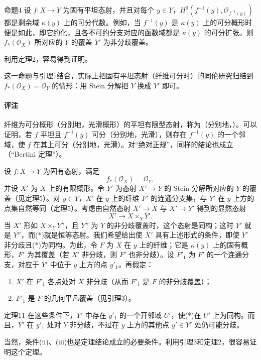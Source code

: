 \begin{statement}{命题4}
设 $f:X\to Y$ 为固有平坦态射，并且对每个 $y\in Y$，$H^0(f^{-1}(y),\mathcal O_{f^{-1}(y)})$ 都是剩余域 $\kappa(y)$ 上的可分代数。例如，当 $f^{-1}(y)$ 是 $\kappa(y)$ 上的可分概形时便是如此，即它约化，且各不可约分支对应的函数域都是 $\kappa(y)$ 的可分扩张。则 $f_*(\mathcal O_X)$ 所对应的 $Y$ 的覆盖 $Y'$ 为非分歧覆盖。
\end{statement}

利用定理2，容易得到证明。

这一命题与引理1结合，实际上把固有平坦态射（纤维可分时）的同伦研究归结到 $f_*(\mathcal O_X)=\mathcal O_Y$ 的情形：用 Stein 分解把 $Y$ 换成 $Y'$ 即可。

\paragraph{评注}
纤维为可分概形（分别地，光滑概形）的平坦有限型态射，称为（分别地，）。可以证明，若 $f$ 平坦且 $f^{-1}(y)$ 可分（分别地，光滑），则存在 $f^{-1}(y)$ 的一个邻域，使 $f$ 在其上可分（分别地，光滑）。对“绝对正规”，同样的结论也成立（“Bertini 定理”）。

设 $f:X\to Y$ 为固有态射，满足
\[
f_*(\mathcal O_X)=\mathcal O_Y,\tag{i}\label{f-homotopy-i}
\]
并设 $X'$ 为 $X$ 上的有限概形。令 $Y'$ 为态射 $X'\to Y$ 的 Stein 分解所对应的 $Y$ 的覆盖（见定理5）。对 $y\in Y$，$X'$ 在 $y$ 上的纤维 $F'$ 的连通分支集，与 $Y'$ 在 $y$ 上方的点集自然等同（定理5）。考虑由自然态射 $X'\to X$ 与 $X'\to Y'$ 得到的显然态射
\[
X'\longrightarrow X\times_YY'.\tag{*}\label{f-homotopy-star}
\]
当 $X'$ 形如 $X\times_YY''$，且 $Y''$ 为 $Y$ 的非分歧覆盖时，这个态射是同构；这时 $Y'$ 就是 $Y''$，而(*)就是恒等态射。我们希望给出使 $X'$ 具有上述形式的条件，即使 $Y'$ 非分歧且(*)为同构。为此，令 $F$ 为 $X$ 在 $y$ 上的纤维；它是 $\kappa(y)$ 上的固有概形，$F'$ 为其覆盖（若 $X'$ 非分歧，则 $F'$ 也非分歧）。设 $F'_1$ 为 $F'$ 的一个连通分支，对应于 $Y'$ 中位于 $y$ 上方的点 $y'_1$。再假定：
\begin{enumerate}
\item[(ii)] $X'$ 在 $F'_1$ 各点处对 $X$ 非分歧（从而 $F'_1$ 是 $F$ 的非分歧覆盖）；
\item[(iii)] $F'_1$ 是 $F$ 的几何平凡覆盖（见引理3）。
\end{enumerate}
\begin{statement}{定理11}
在这些条件下，$Y'$ 中存在 $y'_1$ 的一个开邻域 $U'$，使(*)在 $U'$ 上为同构。而且，$Y'$ 在 $y'_1$ 处对 $Y$ 非分歧，不过在 $y$ 上方的其他点 $y'\in Y'$ 处仍可能分歧。
\end{statement}
当然，条件(ii)、(iii)也是定理结论成立的必要条件。利用引理3和定理2，很容易证明这个定理。

